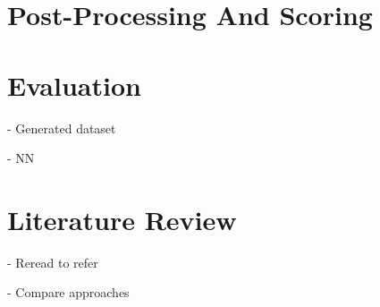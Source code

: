 \documentclass[12pt,twoside]{report}
\theoremstyle{definition}
\begin{document}
\chapter{Post-Processing And Scoring}

\chapter{Evaluation}

- Generated dataset

- NN

\chapter{Literature Review}

- Reread to refer

- Compare approaches


\begin{appendices}
\end{appendices}



\pagestyle{PageNum}
\end{document}
